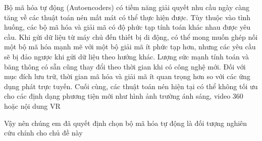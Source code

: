 Bộ mã hóa tự động (Autoencoders) có tiềm năng giải quyết nhu cầu ngày càng
tăng về các thuật
toán nén mất mát có thể thực hiện được. Tùy thuộc vào tình huống,
các bộ mã hóa và giải mã có độ phức tạp tính toán khác nhau được yêu cầu.
Khi gửi dữ liệu từ máy chủ đến thiết bị di động, có thể mong muốn ghép nối
một bộ mã hóa mạnh mẽ với một bộ giải mã ít phức tạp hơn, nhưng các yêu cầu
sẽ bị đảo ngược khi gửi dữ liệu theo hướng khác. Lượng sức mạnh tính toán và
băng thông có sẵn cũng thay đổi theo thời gian khi có công nghệ mới.
Đối với mục đích lưu trữ, thời gian mã hóa và giải mã ít quan trọng hơn
so với các ứng dụng phát trực tuyến. Cuối cùng, các thuật toán nén hiện
tại có thể không tối ưu cho các định dạng phương tiện mới như hình ảnh
trường ánh sáng, video 360 hoặc nội dung VR

Vậy nên chúng em đã quyết định chọn bộ mã hóa tự động là đối tượng nghiên cứu chính cho chủ đề này

